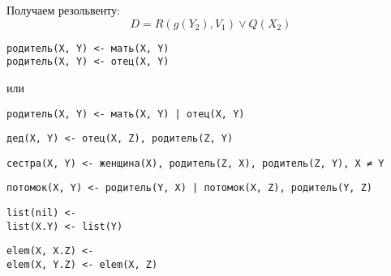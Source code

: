 \documentclass[11pt]{article}
\newcounter{lem}\setcounter{lem}{0}
\begin{document}
Получаем резольвенту:
\begin{equation*}
D = R(g(Y_2), V_1) \lor Q(X_2)
\end{equation*}
\begin{verbatim}
родитель(X, Y) <- мать(X, Y)
родитель(X, Y) <- отец(X, Y)
\end{verbatim}
или
\begin{verbatim}
родитель(X, Y) <- мать(X, Y) | отец(X, Y)
\end{verbatim}
\begin{verbatim}
дед(X, Y) <- отец(X, Z), родитель(Z, Y)
\end{verbatim}
\begin{verbatim}
сестра(X, Y) <- женщина(X), родитель(Z, X), родитель(Z, Y), X ≠ Y
\end{verbatim}
\begin{verbatim}
потомок(X, Y) <- родитель(Y, X) | потомок(X, Z), родитель(Y, Z)
\end{verbatim}
\begin{verbatim}
list(nil) <-
list(X.Y) <- list(Y)
\end{verbatim}
\begin{verbatim}
elem(X, X.Z) <-
elem(X, Y.Z) <- elem(X, Z)
\end{verbatim}
\end{document}
